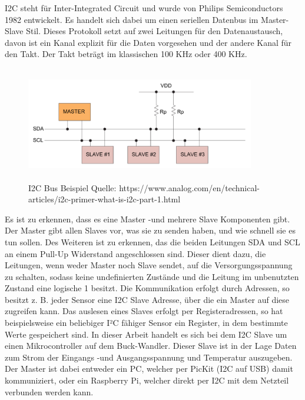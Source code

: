 \begin{flushleft}
I2C steht für Inter-Integrated Circuit und wurde von Philips Semiconductors 1982 entwickelt. Es handelt sich dabei um einen seriellen Datenbus im Master-Slave Stil. Dieses Protokoll setzt auf zwei Leitungen für den Datenaustausch, davon ist ein Kanal explizit für die Daten vorgesehen und der andere Kanal für den Takt. Der Takt beträgt im klassischen 100 KHz oder 400 KHz. 

\begin{figure}
    \centering
    \includegraphics[height= 5cm, width = 10cm]{Pictures/I2C_Bus.png}
    \caption{I2C Bus Beispiel Quelle: https://www.analog.com/en/technical-articles/i2c-primer-what-is-i2c-part-1.html}
\end{figure}

Es ist zu erkennen, dass es eine Master -und mehrere Slave Komponenten gibt. Der Master gibt allen Slaves vor, was sie zu senden haben, und wie schnell sie es tun sollen. Des Weiteren ist zu erkennen, das die beiden Leitungen SDA und SCL an einem Pull-Up Widerstand angeschlossen sind. Dieser dient dazu, die Leitungen, wenn weder Master noch Slave sendet, auf die Versorgungsspannung zu schalten, sodass keine undefinierten Zustände  und die Leitung im unbenutzten Zustand eine logische 1 besitzt. Die Kommunikation erfolgt durch Adressen, so besitzt z. B. jeder Sensor eine I2C Slave Adresse, über die ein Master auf diese zugreifen kann. Das auslesen eines Slaves erfolgt per Registeradressen, so hat beispielsweise ein beliebiger I²C fähiger Sensor ein Register, in dem bestimmte Werte gespeichert sind. In dieser Arbeit handelt es sich bei dem I2C Slave um einen Mikrocontroller auf dem Buck-Wandler. Dieser Slave ist in der Lage Daten zum Strom der Eingangs -und Ausgangsspannung und Temperatur auszugeben. Der Master ist dabei entweder ein PC, welcher per PicKit (I2C auf USB) damit kommuniziert, oder ein Raspberry Pi, welcher direkt per I2C mit dem Netzteil verbunden werden kann.
\end{flushleft}

